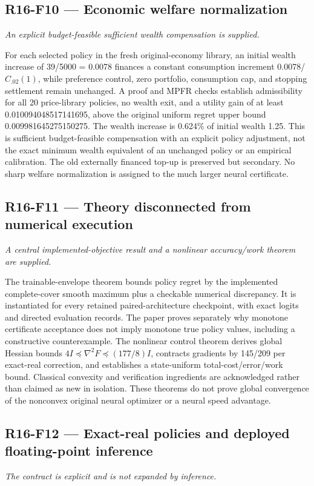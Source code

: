 \documentclass[ecta]{econsocart}
\theoremstyle{remark}
\begin{document}
\subsection{R16-F10 --- Economic welfare normalization}
\noindent\emph{An explicit budget-feasible sufficient wealth compensation is supplied.}

For each selected policy in the fresh original-economy library, an initial wealth increase of 39/5000 = 0.0078 finances a constant consumption increment 0.0078/$C_{.02}(1)$, while preference control, zero portfolio, consumption cap, and stopping settlement remain unchanged. A proof and MPFR checks establish admissibility for all 20 price-library policies, no wealth exit, and a utility gain of at least 0.010094048517141695, above the original uniform regret upper bound 0.009981645275150275. The wealth increase is 0.624\% of initial wealth 1.25. This is sufficient budget-feasible compensation with an explicit policy adjustment, not the exact minimum wealth equivalent of an unchanged policy or an empirical calibration. The old externally financed top-up is preserved but secondary. No sharp welfare normalization is assigned to the much larger neural certificate.

\subsection{R16-F11 --- Theory disconnected from numerical execution}
\noindent\emph{A central implemented-objective result and a nonlinear accuracy/work theorem are supplied.}

The trainable-envelope theorem bounds policy regret by the implemented complete-cover smooth maximum plus a checkable numerical discrepancy. It is instantiated for every retained paired-architecture checkpoint, with exact logits and directed evaluation records. The paper proves separately why monotone certificate acceptance does not imply monotone true policy values, including a constructive counterexample. The nonlinear control theorem derives global Hessian bounds $4I\preceq\nabla^2 F\preceq(177/8)I$, contracts gradients by 145/209 per exact-real correction, and establishes a state-uniform total-cost/error/work bound. Classical convexity and verification ingredients are acknowledged rather than claimed as new in isolation. These theorems do not prove global convergence of the nonconvex original neural optimizer or a neural speed advantage.

\subsection{R16-F12 --- Exact-real policies and deployed floating-point inference}
\noindent\emph{The contract is explicit and is not expanded by inference.}
\end{document}
